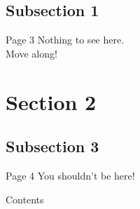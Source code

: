 \documentclass[xcolor=dvipsnames]{beamer}
\begin{document}
\subsection{Subsection 1}

\begin{frame}{Page 3}
    Nothing to see here. \\
    Move along!
\end{frame}



\section{Section 2}
\subsection{Subsection 3}
\begin{frame}{Page 4}
    You shouldn't be here!
\end{frame}



\begin{frame}{Contents}
    \tableofcontents
\end{frame}
\end{document}
